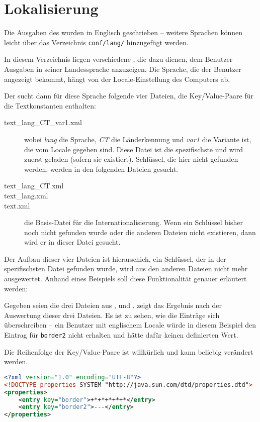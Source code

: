 \section{Lokalisierung}
Die Ausgaben des \md{} wurden in Englisch geschrieben -- weitere Sprachen können leicht über das Verzeichnis \texttt{conf/lang/} hinzugefügt werden.

In diesem Verzeichnis liegen verschiedene , die dazu dienen, dem Benutzer Ausgaben in seiner Landessprache anzuzeigen. Die Sprache, die der Benutzer angezeigt bekommt, hängt von der Locale-Einstellung des Computers ab.

Der \md{} sucht dann für diese Sprache folgende vier Dateien, die Key/Value-Paare für die Textkonstanten enthalten:
\begin{description}
\item[text_lang_CT_var1.xml] wobei \emph{lang} die Sprache, \emph{CT} die Länderkennung und \emph{var1} die Variante ist, die vom Locale gegeben sind. Diese Datei ist die spezifischste und wird zuerst geladen (sofern sie existiert). Schlüssel, die hier nicht gefunden werden, werden in den folgenden Dateien gesucht.
\item[text_lang_CT.xml]
\item[text_lang.xml]
\item[text.xml] die Basis-Datei für die Internationalisierung. Wenn ein Schlüssel bisher noch nicht gefunden wurde oder die anderen Dateien nicht existieren, dann wird er in dieser Datei gesucht.
\end{description}

Der Aufbau dieser vier Dateien ist hierarschich, ein Schlüssel, der in der spezifischsten Datei gefunden wurde, wird aus den anderen Dateien nicht mehr ausgewertet. Anhand eines Beispiels soll diese Funktionalität genauer erläutert werden:

Gegeben seien die drei Dateien aus ,  und .  zeigt das Ergebnis nach der Auswertung dieser drei Dateien. Es ist zu sehen, wie die Einträge sich überschreiben -- ein Benutzer mit englischem Locale würde in diesem Beispiel den Eintrag für \texttt{border2} nicht erhalten und hätte dafür keinen definierten Wert.

Die Reihenfolge der Key/Value-Paare ist willkürlich und kann beliebig verändert werden.

\begin{lstlisting}[language=XML,caption={Beispiel für Datei \texttt{text_de_DE.xml}},label=\lstlbl{locale-file-de-de}]
<?xml version="1.0" encoding="UTF-8"?>
<!DOCTYPE properties SYSTEM "http://java.sun.com/dtd/properties.dtd">
<properties>
	<entry key="border">+*+*+*+*+*</entry>
	<entry key="border2">---</entry>
</properties>
\end{lstlisting}

